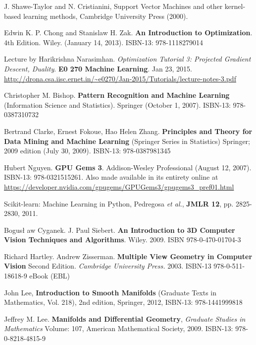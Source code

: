 \documentclass[10pt]{amsart}
\begin{document}
\begin{thebibliography}{9}
J.  Shawe-Taylor  and  N.  Cristianini,  Support  Vector  Machines  and  other  kernel-based  learning  methods,
Cambridge University Press (2000).



Edwin K. P. Chong and Stanislaw H. Zak.  \textbf{An Introduction to Optimization}.  4th Edition.  Wiley.  (January 14, 2013).  ISBN-13: 978-1118279014
  
Lecture by Harikrishna Narasimhan.  \emph{Optimization Tutorial 3: Projected Gradient Descent, Duality}.  \textbf{E0 270 Machine Learning}.  Jan 23, 2015.  \url{http://drona.csa.iisc.ernet.in/~e0270/Jan-2015/Tutorials/lecture-notes-3.pdf}

Christopher M. Bishop.  \textbf{Pattern Recognition and Machine Learning} (Information Science and Statistics).  Springer (October 1, 2007).  ISBN-13: 978-0387310732


Bertrand Clarke, Ernest Fokoue, Hao Helen Zhang.   \textbf{Principles and Theory for Data Mining and Machine Learning} (Springer Series in Statistics)  Springer; 2009 edition (July 30, 2009).  ISBN-13: 978-0387981345
 

Hubert Nguyen. \textbf{GPU Gems 3}.  Addison-Wesley Professional (August 12, 2007).  ISBN-13: 978-0321515261.  Also made available in its entirety online at \url{https://developer.nvidia.com/gpugems/GPUGems3/gpugems3_pref01.html}

  Scikit-learn: Machine Learning in Python, Pedregosa \emph{et al.}, \textbf{JMLR 12}, pp. 2825-2830, 2011.


Bogus\l{} aw Cyganek.  J. Paul Siebert.  \textbf{An Introduction to 3D Computer Vision Techniques and Algorithms}.  Wiley.  2009.  ISBN 978-0-470-01704-3

Richard Hartley.  Andrew Zisserman.  \textbf{Multiple View Geometry in Computer Vision}  Second Edition.  \emph{Cambridge University Press.}  2003.  ISBN-13 978-0-511-18618-9 eBook (EBL)

John Lee, \textbf{Introduction to Smooth Manifolds} (Graduate Texts in Mathematics, Vol. 218), 2nd edition, Springer,  2012, ISBN-13: 978-1441999818

Jeffrey M. Lee. \textbf{Manifolds and Differential Geometry}, \emph{Graduate Studies in Mathematics} Volume: 107, American Mathematical Society, 2009. ISBN-13: 978-0-8218-4815-9




\end{thebibliography}
\end{document}
